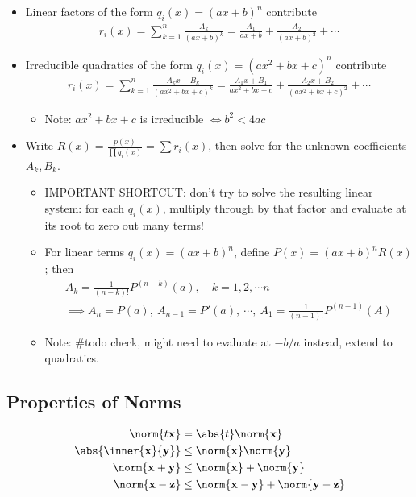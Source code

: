 \begin{itemize}
\item
  Linear factors of the form \(q_i(x) = (ax+b)^n\) contribute
  \begin{align*}
  r_i(x) = \sum_{k=1}^n \frac{A_k}{(ax+b)^k} = \frac{A_1}{ax+b} + \frac{A_2}{(ax+b)^2} + \cdots
  \end{align*}
\item
  Irreducible quadratics of the form \(q_i(x) = (ax^2+bx+c)^n\)
  contribute
  \begin{align*}
  r_i(x) = \sum_{k=1}^n \frac{A_k x + B_k}{(ax^2+bx+c)^k} = \frac{A_1x+B_1}{ax^2+bx+c} + \frac{A_2x+B_2}{(ax^2+bx+c)^2} + \cdots
  \end{align*}

  \begin{itemize}
  \tightlist
  \item
    Note: \(ax^2+bx+c\) is irreducible \(\iff b^2 < 4ac\)
  \end{itemize}
\item
  Write \(R(x) = \frac{p(x)}{\prod q_i(x)} = \sum r_i(x)\), then solve
  for the unknown coefficients \(A_k, B_k\).

  \begin{itemize}
  \item
    IMPORTANT SHORTCUT: don't try to solve the resulting linear system:
    for each \(q_i(x)\), multiply through by that factor and evaluate at
    its root to zero out many terms!
  \item
    For linear terms \(q_i(x) = (ax+b)^n\), define
    \(P(x) = (ax+b)^nR(x)\); then
    \begin{align*}
    A_{k} =  \frac{1}{(n-k)!}P^{(n-k)}(a), \quad k = 1,2,\cdots n \\ \implies A_n= P(a),~ A_{n-1} = P'(a),~ \cdots,~ A_1 = \frac{1}{(n-1)!}P^{(n-1)}(A)
    \end{align*}
  \item
    Note: \#todo check, might need to evaluate at \(-b/a\) instead,
    extend to quadratics.
  \end{itemize}
\end{itemize}

\hypertarget{properties-of-norms}{%
\subsection{Properties of Norms}\label{properties-of-norms}}

\begin{align*}
\norm{t\mathbf x}                  & = \abs{t} \norm{\mathbf x} \\
\abs{\inner{\mathbf x}{\mathbf y}} & \leq \norm{\mathbf x} \norm{\mathbf y} \\
\norm{\mathbf x+\mathbf y}         & \leq \norm{\mathbf x} + \norm{\mathbf y} \\
\norm{\mathbf x-\mathbf z}         & \leq \norm{\mathbf x-\mathbf y} + \norm{\mathbf y-\mathbf z}
\end{align*}

